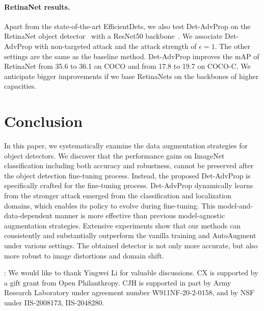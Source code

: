 \documentclass[final]{cvpr}
\begin{document}
\vspace{-4pt}
\paragraph{RetinaNet results.}
Apart from the state-of-the-art EfficientDets, we also test Det-AdvProp on the RetinaNet object detector~\cite{lin2017focal} with a ResNet50 backbone~\cite{he2016resnet}. 
We associate Det-AdvProp with non-targeted attack and the attack strength of $\epsilon=1$. 
The other settings are the same as the baseline method.
Det-AdvProp improves the mAP of RetinaNet from 35.6 to 36.1 on COCO and from 17.8 to 19.7 on COCO-C.
We anticipate bigger improvements if we base RetinaNets on the backbones of higher capacities. 

\vspace{-4pt}
\section{Conclusion}
In this paper, we systematically examine the data augmentation strategies for object detectors.
We discover that the performance gains on ImageNet classification including both accuracy and robustness, cannot be preserved after the object detection fine-tuning process.
Instead, the proposed Det-AdvProp is specifically crafted for the fine-tuning process.
Det-AdvProp dynamically learns from the stronger attack emerged from the classification and localization domains, which enables its policy to evolve during fine-tuning.
This model-and-data-dependent manner is more effective than previous model-agnostic augmentation strategies.
Extensive experiments show that our methods can consistently and substantially outperform the vanilla training and AutoAugment under various settings.
The obtained detector is not only more accurate, but also more robust to image distortions and domain shift.

{\footnotesize
{: We would like to thank Yingwei Li for valuable discussions. CX is supported by a gift grant from Open Philanthropy. CJH is supported in part by Army Research Laboratory under agreement number 	
W911NF-20-2-0158, and by NSF under  IIS-2008173, IIS-2048280. }
}







{\small


}

\clearpage
\end{document}
